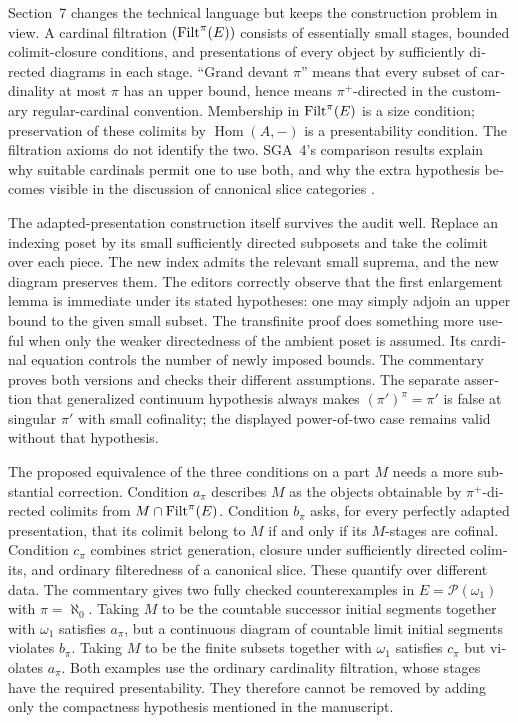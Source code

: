 \begin{otherlanguage}{english}
Section~7 changes the technical language but keeps the construction problem in view. A cardinal filtration $(\mathrm{Filt}^\pi(E))$ consists of essentially small stages, bounded colimit-closure conditions, and presentations of every object by sufficiently directed diagrams in each stage. ``Grand devant $\pi$'' means that every subset of cardinality at most $\pi$ has an upper bound, hence means $\pi^+$-directed in the customary regular-cardinal convention. Membership in $\mathrm{Filt}^\pi(E)$ is a size condition; preservation of these colimits by $\operatorname{Hom}(A,-)$ is a presentability condition. The filtration axioms do not identify the two. SGA~4's comparison results explain why suitable cardinals permit one to use both, and why the extra hypothesis becomes visible in the discussion of canonical slice categories \citep[I, 9.12 and 9.16--9.18]{SGA4I1972}.

The adapted-presentation construction itself survives the audit well. Replace an indexing poset by its small sufficiently directed subposets and take the colimit over each piece. The new index admits the relevant small suprema, and the new diagram preserves them. The editors correctly observe that the first enlargement lemma is immediate under its stated hypotheses: one may simply adjoin an upper bound to the given small subset. The transfinite proof does something more useful when only the weaker directedness of the ambient poset is assumed. Its cardinal equation controls the number of newly imposed bounds. The commentary proves both versions and checks their different assumptions. The separate assertion that generalized continuum hypothesis always makes $(\pi')^\pi=\pi'$ is false at singular $\pi'$ with small cofinality; the displayed power-of-two case remains valid without that hypothesis.

The proposed equivalence of the three conditions on a part $M$ needs a more substantial correction. Condition $a_\pi$ describes $M$ as the objects obtainable by $\pi^+$-directed colimits from $M\cap\mathrm{Filt}^\pi(E)$. Condition $b_\pi$ asks, for every perfectly adapted presentation, that its colimit belong to $M$ if and only if its $M$-stages are cofinal. Condition $c_\pi$ combines strict generation, closure under sufficiently directed colimits, and ordinary filteredness of a canonical slice. These quantify over different data. The commentary gives two fully checked counterexamples in $E=\mathcal P(\omega_1)$ with $\pi=\aleph_0$. Taking $M$ to be the countable successor initial segments together with $\omega_1$ satisfies $a_\pi$, but a continuous diagram of countable limit initial segments violates $b_\pi$. Taking $M$ to be the finite subsets together with $\omega_1$ satisfies $c_\pi$ but violates $a_\pi$. Both examples use the ordinary cardinality filtration, whose stages have the required presentability. They therefore cannot be removed by adding only the compactness hypothesis mentioned in the manuscript.


\end{otherlanguage}
